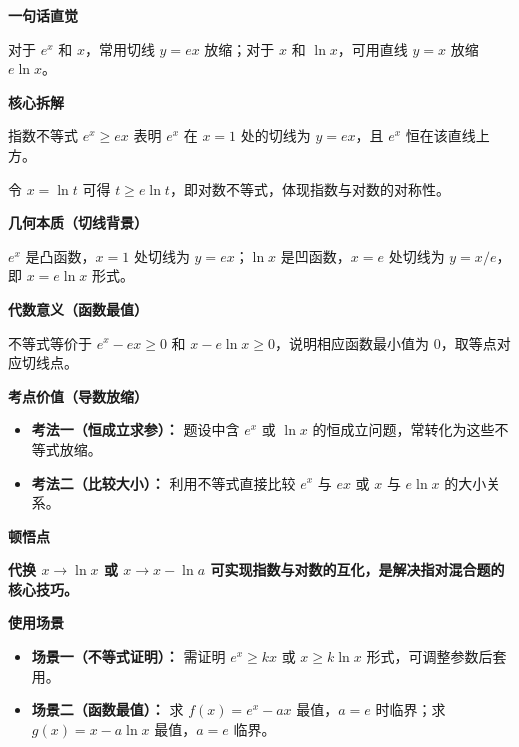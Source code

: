 \begin{explanationbox}
	\textbf{\textcolor{CExplanation}{一句话直觉}}

	对于 $e^x$ 和 $x$，常用切线 $y=ex$ 放缩；对于 $x$ 和 $\ln x$，可用直线 $y=x$ 放缩 $e\ln x$。

	\medskip
	\textbf{\textcolor{CExplanation}{核心拆解}}
	\begin{description}[style=nextline, leftmargin=2.8em, labelsep=0.5em, itemsep=0.45em]
		\item[\textbf{要点一（切线放缩）：}] 指数不等式 $e^x\ge ex$ 表明 $e^x$ 在 $x=1$ 处的切线为 $y=ex$，且 $e^x$ 恒在该直线上方。
		\item[\textbf{要点二（同构对称）：}] 令 $x=\ln t$ 可得 $t\ge e\ln t$，即对数不等式，体现指数与对数的对称性。
	\end{description}

	\medskip
	\textbf{\textcolor{CExplanation}{几何本质（切线背景）}}

	$e^x$ 是凸函数，$x=1$ 处切线为 $y=ex$；$\ln x$ 是凹函数，$x=e$ 处切线为 $y=x/e$，即 $x=e\ln x$ 形式。

	\medskip
	\textbf{\textcolor{CExplanation}{代数意义（函数最值）}}

	不等式等价于 $e^x - ex\ge 0$ 和 $x-e\ln x\ge 0$，说明相应函数最小值为 $0$，取等点对应切线点。

	\medskip
	\textbf{\textcolor{CExplanation}{考点价值（导数放缩）}}
	\begin{itemize}[leftmargin=*, itemsep=0.5em, topsep=0.4em]
		\item \textbf{考法一（恒成立求参）：} 题设中含 $e^x$ 或 $\ln x$ 的恒成立问题，常转化为这些不等式放缩。
		\item \textbf{考法二（比较大小）：} 利用不等式直接比较 $e^x$ 与 $ex$ 或 $x$ 与 $e\ln x$ 的大小关系。
	\end{itemize}

	\medskip
	\textbf{\textcolor{CExplanation}{顿悟点}}

	\textbf{代换 $x\to \ln x$ 或 $x\to x-\ln a$ 可实现指数与对数的互化，是解决指对混合题的核心技巧。}

	\medskip
	\textbf{\textcolor{CExplanation}{使用场景}}
	\begin{itemize}[leftmargin=*, itemsep=0.5em, topsep=0.4em]
		\item \textbf{场景一（不等式证明）：} 需证明 $e^x\ge kx$ 或 $x\ge k\ln x$ 形式，可调整参数后套用。
		\item \textbf{场景二（函数最值）：} 求 $f(x)=e^x - ax$ 最值，$a=e$ 时临界；求 $g(x)=x-a\ln x$ 最值，$a=e$ 临界。
	\end{itemize}
\end{explanationbox}
